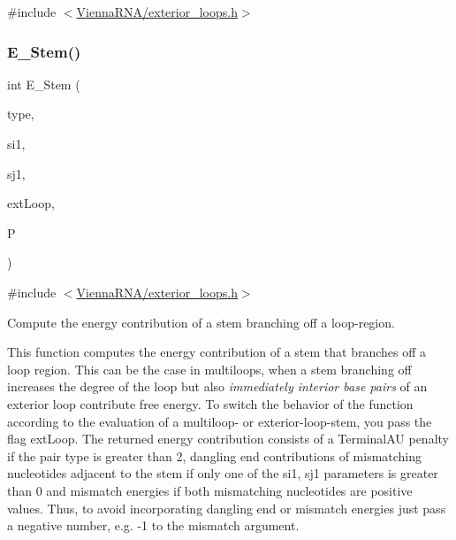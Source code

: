 {\ttfamily \#include $<$\mbox{\hyperlink{exterior__loops_8h}{Vienna\+R\+N\+A/exterior\+\_\+loops.\+h}}$>$}

\mbox{\label{group__loops_ga51f9851f3500c2aae66674142a6a2dd5}} 
\subsubsection{\texorpdfstring{E\+\_\+\+Stem()}{E\_Stem()}}
{\footnotesize\ttfamily int E\+\_\+\+Stem (\begin{DoxyParamCaption}\item[{int}]{type,  }\item[{int}]{si1,  }\item[{int}]{sj1,  }\item[{int}]{ext\+Loop,  }\item[{\mbox{\hyperlink{group__energy__parameters_ga8a69ca7d787e4fd6079914f5343a1f35}{vrna\+\_\+param\+\_\+t}} $\ast$}]{P }\end{DoxyParamCaption})}



{\ttfamily \#include $<$\mbox{\hyperlink{exterior__loops_8h}{Vienna\+R\+N\+A/exterior\+\_\+loops.\+h}}$>$}



Compute the energy contribution of a stem branching off a loop-\/region. 

This function computes the energy contribution of a stem that branches off a loop region. This can be the case in multiloops, when a stem branching off increases the degree of the loop but also {\itshape immediately interior base pairs} of an exterior loop contribute free energy. To switch the behavior of the function according to the evaluation of a multiloop-\/ or exterior-\/loop-\/stem, you pass the flag \textquotesingle{}ext\+Loop\textquotesingle{}. The returned energy contribution consists of a Terminal\+AU penalty if the pair type is greater than 2, dangling end contributions of mismatching nucleotides adjacent to the stem if only one of the si1, sj1 parameters is greater than 0 and mismatch energies if both mismatching nucleotides are positive values. Thus, to avoid incorporating dangling end or mismatch energies just pass a negative number, e.\+g. -\/1 to the mismatch argument.

